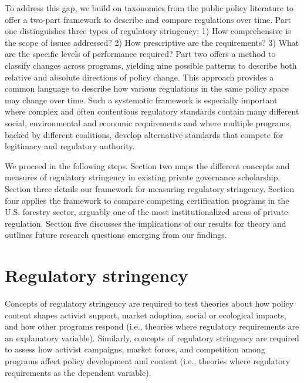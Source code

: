 \documentclass[
      12pt,
            Review ]{article}
\begin{document}
To address this gap, we build on taxonomies from the public policy literature to offer a two-part framework to describe and compare regulations over time. Part one distinguishes three types of regulatory stringency: 1) How comprehensive is the scope of issues addressed? 2) How prescriptive are the requirements? 3) What are the specific levels of performance required? Part two offers a method to classify changes across programs, yielding nine possible patterns to describe both relative and absolute directions of policy change. This approach provides a common language to describe how various regulations in the same policy space may change over time. Such a systematic framework is especially important where complex and often contentious regulatory standards contain many different social, environmental and economic requirements and where multiple programs, backed by different coalitions, develop alternative standards that compete for legitimacy and regulatory authority.

We proceed in the following steps. Section two maps the different concepts and measures of regulatory stringency in existing private governance scholarship. Section three details our framework for measuring regulatory stringency. Section four applies the framework to compare competing certification programs in the U.S. forestry sector, arguably one of the most institutionalized areas of private regulation. Section five discusses the implications of our results for theory and outlines future research questions emerging from our findings.

\hypertarget{regulatory-stringency}{%
\section{Regulatory stringency}\label{regulatory-stringency}}

Concepts of regulatory stringency are required to test theories about how policy content shapes activist support, market adoption, social or ecological impacts, and how other programs respond (i.e., theories where regulatory requirements are an explanatory variable). Similarly, concepts of regulatory stringency are required to assess how activist campaigns, market forces, and competition among programs affect policy development and content (i.e., theories where regulatory requirements as the dependent variable).
\end{document}
